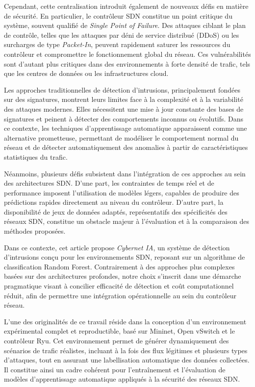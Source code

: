 \documentclass[11pt]{article}
\begin{document}
Cependant, cette centralisation introduit également de nouveaux défis en matière de sécurité. En particulier, le contrôleur SDN constitue un point critique du système, souvent qualifié de \textit{Single Point of Failure}. Des attaques ciblant le plan de contrôle, telles que les attaques par déni de service distribué (DDoS) ou les surcharges de type \textit{Packet-In}, peuvent rapidement saturer les ressources du contrôleur et compromettre le fonctionnement global du réseau. Ces vulnérabilités sont d’autant plus critiques dans des environnements à forte densité de trafic, tels que les centres de données ou les infrastructures cloud.

Les approches traditionnelles de détection d’intrusions, principalement fondées sur des signatures, montrent leurs limites face à la complexité et à la variabilité des attaques modernes. Elles nécessitent une mise à jour constante des bases de signatures et peinent à détecter des comportements inconnus ou évolutifs. Dans ce contexte, les techniques d’apprentissage automatique apparaissent comme une alternative prometteuse, permettant de modéliser le comportement normal du réseau et de détecter automatiquement des anomalies à partir de caractéristiques statistiques du trafic.

Néanmoins, plusieurs défis subsistent dans l’intégration de ces approches au sein des architectures SDN. D’une part, les contraintes de temps réel et de performance imposent l’utilisation de modèles légers, capables de produire des prédictions rapides directement au niveau du contrôleur. D’autre part, la disponibilité de jeux de données adaptés, représentatifs des spécificités des réseaux SDN, constitue un obstacle majeur à l’évaluation et à la comparaison des méthodes proposées.

Dans ce contexte, cet article propose \textit{Cybernet IA}, un système de détection d’intrusions conçu pour les environnements SDN, reposant sur un algorithme de classification Random Forest. Contrairement à des approches plus complexes basées sur des architectures profondes, notre choix s’inscrit dans une démarche pragmatique visant à concilier efficacité de détection et coût computationnel réduit, afin de permettre une intégration opérationnelle au sein du contrôleur réseau.

L’une des originalités de ce travail réside dans la conception d’un environnement expérimental complet et reproductible, basé sur Mininet, Open vSwitch et le contrôleur Ryu. Cet environnement permet de générer dynamiquement des scénarios de trafic réalistes, incluant à la fois des flux légitimes et plusieurs types d’attaques, tout en assurant une labellisation automatique des données collectées. Il constitue ainsi un cadre cohérent pour l’entraînement et l’évaluation de modèles d’apprentissage automatique appliqués à la sécurité des réseaux SDN.
\end{document}
